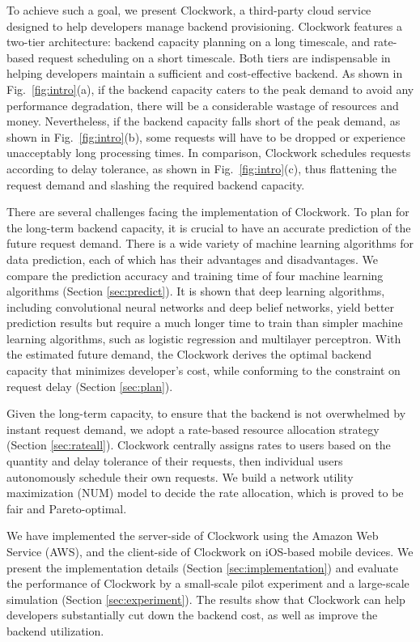 To achieve such a goal, we present Clockwork, a third-party cloud service designed to help developers manage backend provisioning. Clockwork features a two-tier architecture: backend capacity planning on a long timescale, and rate-based request scheduling on a short timescale. Both tiers are indispensable in helping developers maintain a sufficient and cost-effective backend. As shown in Fig.~\ref{fig:intro}(a), if the backend capacity caters to the peak demand to avoid any performance degradation, there will be a considerable wastage of resources and money. Nevertheless, if the backend capacity falls short of the peak demand, as shown in Fig.~\ref{fig:intro}(b), some requests will have to be dropped or experience unacceptably long processing times. In comparison, Clockwork schedules requests according  to delay tolerance, as shown in Fig.~\ref{fig:intro}(c), thus flattening the request demand and slashing the required backend capacity.


There are several challenges facing the implementation of Clockwork. To plan for the long-term backend capacity, it is crucial to have an accurate prediction of the future request demand. There is a wide variety of machine learning algorithms for data prediction, each of which has their advantages and disadvantages. We compare the prediction accuracy and training time of four machine learning algorithms (Section \ref{sec:predict}). It is shown that deep learning algorithms, including convolutional neural networks and deep belief networks, yield better prediction results but require a much longer time to train than simpler machine learning algorithms, such as logistic regression and multilayer perceptron. With the estimated future demand, the Clockwork derives the optimal backend capacity that minimizes developer's cost, while conforming to the constraint on request delay  (Section \ref{sec:plan}).

Given the long-term capacity, to ensure that the backend is not overwhelmed by instant request demand, we adopt a rate-based resource allocation strategy (Section \ref{sec:rateall}). Clockwork centrally assigns rates to users based on the quantity and delay tolerance of their requests, then individual users autonomously schedule their own requests. We build a network utility maximization (NUM) model to decide the rate allocation, which is proved to be fair and Pareto-optimal.



We have implemented the server-side of Clockwork using the Amazon Web Service (AWS), and the client-side of Clockwork on iOS-based mobile devices. We present the implementation details (Section \ref{sec:implementation}) and evaluate the performance of Clockwork by a small-scale pilot experiment and a large-scale simulation (Section \ref{sec:experiment}). The results show that Clockwork can help developers substantially cut down the backend cost, as well as improve the backend utilization.











